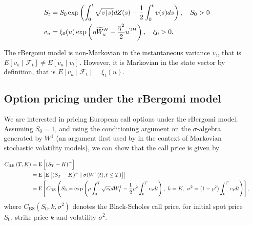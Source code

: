 \begin{align}\label{eq:rBergomi_model}
	S_t&= S_0  \operatorname{exp}\left( \int_{0}^{t} \sqrt{v(s)} dZ(s)- \frac{1}{2} \int_{0}^{t} v(s) ds   \right),\quad S_0>0 \nonumber\\
	v_u&=\xi_0(u) \operatorname{exp}\left( \eta \widetilde{W}_u^H- \frac{\eta^2}{2} u^{2H} \right), \quad \xi_0>0 .
\end{align}
\begin{remark}
The rBergomi model is non-Markovian in the instantaneous variance $v_t$, that is $E\left[v_u\mid \mathcal{F}_t\right] \neq E\left[v_u\mid v_t\right]$. However, it is Markovian in the state vector by definition, that is $E\left[v_u\mid\mathcal{F}_t\right]=\xi_t(u)$.
\end{remark}


\subsection{Option pricing under the rBergomi model}\label{sec:Option pricing under rBergomi model}

We are interested in pricing European call options under the rBergomi model. Assuming $S_0 = 1$, and using the conditioning argument on the $\sigma$-algebra generated by $W^1$ (an argument first used by \cite{romano1997contingent} in the context of Markovian stochastic volatility  models), we can  show that the call price is given by

\begin{align}\label{BS_formula_rbergomi}
	C_{\text{RB}}\left( T, K \right) &= \text{E}\left[ \left(S_T - K \right)^+ \right]  \nonumber\\
	&=\mathrm{E}\left[\mathrm{E}\left[(S_T-K)^+ \mid \sigma(W^1(t) ,t \le T)\right]\right]\nonumber \\
	&=\text{E}\left[C_{\text{BS}}\left( S_0 = \operatorname{exp}\left(\rho \int_0^T \sqrt{v_t} dW_t^1 - \frac{1}{2}
	\rho^2 \int_0^T v_t dt\right),\ k = K, \ \sigma^2 = (1-\rho^2)
	\int_0^T v_t dt \right) \right],
\end{align}
where $C_{\text{BS}}(S_0,k,\sigma^2)$ denotes the Black-Scholes call price, for initial spot price $S_0$, strike price $k$ and volatility $\sigma^2$.


